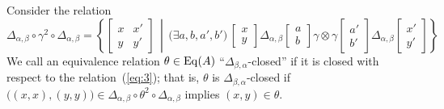 Consider the relation
\begin{equation}
  \label{eq:3}
  \Delta_{\alpha, \beta} \circ \gamma^2 \circ \Delta_{\alpha, \beta} =
  \left\{
  \begin{bmatrix} x & x'\\y & y' \end{bmatrix}
  \,\middle|\,
  \bigl(\exists a, b, a', b'\bigr) \,
  \begin{bmatrix} x\\y \end{bmatrix}
  \mathrel{\Delta_{\alpha, \beta}}
  \begin{bmatrix} a\\b \end{bmatrix}
  \mathrel{\gamma\otimes \gamma}
  \begin{bmatrix} a'\\b' \end{bmatrix}
  \mathrel{\Delta_{\alpha, \beta}}
  \begin{bmatrix} x'\\y' \end{bmatrix}\right\}
\end{equation}
We call an equivalence relation $\theta\in \operatorname{Eq}(A)$ ``$\Delta_{\beta,\alpha}$-closed'' if
it is closed with respect to the relation~(\ref{eq:3});
that is, $\theta$ is $\Delta_{\beta,\alpha}$-closed if
$\bigl((x,x),(y,y)\bigr) \in \Delta_{\alpha, \beta} \circ \theta^2 \circ \Delta_{\alpha, \beta}$
implies $(x,y) \in \theta$.

